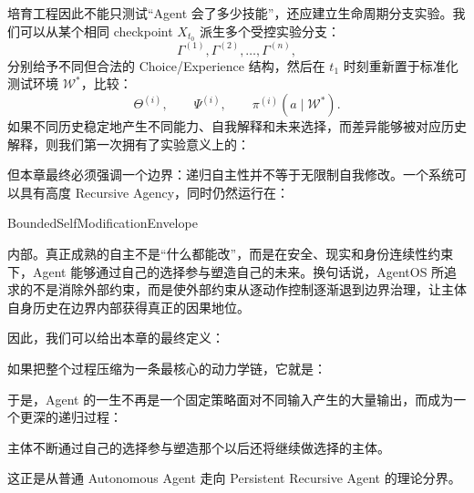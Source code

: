 培育工程因此不能只测试“Agent 会了多少技能”，还应建立生命周期分支实验。我们可以从某个相同 checkpoint $X_{t_0}$ 派生多个受控实验分支：
\[
\Gamma^{(1)},\Gamma^{(2)},\ldots,\Gamma^{(n)},
\]
分别给予不同但合法的 Choice/Experience 结构，然后在 $t_1$ 时刻重新置于标准化测试环境 $\mathcal W^\ast$，比较：
\[
\Theta^{(i)},
\qquad
\Psi^{(i)},
\qquad
\pi^{(i)}(a\mid\mathcal W^\ast).
\]
如果不同历史稳定地产生不同能力、自我解释和未来选择，而差异能够被对应历史解释，则我们第一次拥有了实验意义上的：
\begin{statementbox}
\centering
{}
\end{statementbox}

但本章最终必须强调一个边界：递归自主性并不等于无限制自我修改。一个系统可以具有高度 Recursive Agency，同时仍然运行在：
\begin{statementbox}
BoundedSelfModificationEnvelope
\end{statementbox}
内部。真正成熟的自主不是“什么都能改”，而是在安全、现实和身份连续性约束下，Agent 能够通过自己的选择参与塑造自己的未来。换句话说，AgentOS 所追求的不是消除外部约束，而是使外部约束从逐动作控制逐渐退到边界治理，让主体自身历史在边界内部获得真正的因果地位。

因此，我们可以给出本章的最终定义：

\begin{statementbox}
\centering
{}
\end{statementbox}

如果把整个过程压缩为一条最核心的动力学链，它就是：
\begin{statementbox}
\centering
{}
\end{statementbox}

于是，Agent 的一生不再是一个固定策略面对不同输入产生的大量输出，而成为一个更深的递归过程：
\begin{statementbox}
主体不断通过自己的选择参与塑造那个以后还将继续做选择的主体。
\end{statementbox}

这正是从普通 Autonomous Agent 走向 Persistent Recursive Agent 的理论分界。
